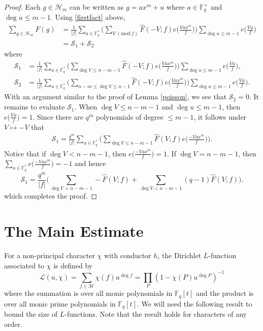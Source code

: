 \documentclass[12pt,reqno]{amsart}
\newcommand{\Mod}[1]{\ (\mathrm{mod}\ #1)}
\newcommand{\BF}{\mathbb{F}}
\newcommand{\CL}{\mathcal{L}}
\newcommand{\CM}{\mathcal{M}}
\newcommand{\CH}{\mathcal{H}}
\newcommand{\CS}{\mathcal{S}}
\begin{document}
\begin{proof}
Each $g \in \CH_{m}$ can be written as $g = ax^m + u $ where $a \in \BF_{q}^{\times}$ and $\deg u \leq m-1.$ Using \eqref{firstfact} above, 
\begin{align*}
 \sum\limits_{g \in \CH_{m}} F(g) &= \frac{1}{|f|} \sum_{a \in \BF_{q}^{*}} \Big ( \sum\limits_{V\Mod f} \widehat{F}(-V;f) e \Big ( \frac{Vax^m}{f} \Big) \Big ) \sum\limits_{\deg u \leq m-1} e\Big( \frac{Vu}{f} \Big) \\
 &= \CS_1 + \CS_2
 \end{align*}
where 
\begin{align*}
 \CS_1 &= \frac{1}{|f|} \sum_{a \in \BF_{q}^{*}} \Big ( \sum\limits_{\deg V \leq n-m-1} \widehat{F}(-V;f) e \Big ( \frac{Vax^m}{f} \Big) \Big )\sum\limits_{\deg u \leq m-1} e\Big(\frac{Vu}{f} \Big), \\
 \CS_2 &= \frac{1}{|f|} \sum_{a \in \BF_{q}^{*}} \Big (\sum\limits_{n-m \leq \deg V \leq n-1} \widehat{F}(-V;f) e \Big ( \frac{Vax^m}{f} \Big) \Big ) \sum\limits_{\deg u \leq m-1} e\Big(\frac{Vu}{f} \Big).
\end{align*}
With an argument similar to the proof of Lemma \ref{poisson}, we see that $\CS_2 = 0$. It remains to evaluate $\CS_1$. When $\deg V \leq n-m-1$ and $\deg u \leq m-1$, then $e \Big( \frac{Vu}{f} \Big ) = 1.$ Since there are $q^m$ polynomials of degree $ \leq m-1$, it follows under $V \mapsto -V$ that
\begin{align}\label{firstsummand2}
\CS_1 = \frac{q^m}{|f|} \sum_{a \in \BF_{q}^{*}} \Big (\sum\limits_{\deg V \leq n-m-1} \widehat{F}(V;f) e \Big ( \frac{-Vax^m}{f} \Big ) \Big ).
\end{align}
Notice that if $\deg V < n-m-1$, then $e \Big ( \frac{-Vax^m}{f} \Big ) = 1$. If $\deg V = n-m-1$, then $\sum\limits_{a \in \BF_{q}^{*}} e \Big ( \frac{-Vax^m}{f} \Big ) = -1$ and hence
$$
   \CS_1 = \frac{q^m}{|f|} \Big (\sum\limits_{\deg V = n-m-1} -\widehat{F}(V;f) + \sum\limits_{\deg V < n-m-1} (q-1)\widehat{F}(V;f) \Big ).
$$
which completes the proof. 
\end{proof}





\section{The Main Estimate}
For a non-principal character $\chi$ with conductor $h$, the Dirichlet $L$-function associated to $\chi$ is defined by 
\[
\CL(u,\chi) = \sum_{f \in \CM} \chi(f) u^{\deg f} = \prod_{P} (1-\chi(P)u^{\deg P})^{-1}
\]
where the summation is over all monic polynomials in $\BF_{q}[t]$ and the product is over all monic prime polynomials in $\BF_{q}[t]$. We will need the following result to bound the size of $L$-functions. Note that the result holds for characters of any order. 
\end{document}
